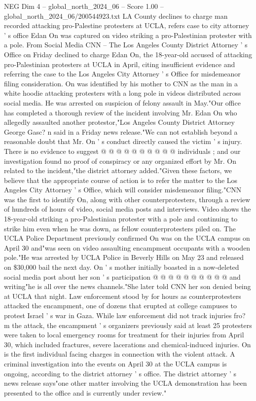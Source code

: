 \begin{textsample}{NEG Dim 4 – global\_north\_2024\_06 – Score 1.00 – global\_north\_2024\_06/200544923.txt}  \label{ex:f4_neg_323}
LA County declines to charge man recorded attacking pro-Palestine protesters at UCLA, refers case to city attorney ' s office Edan On was captured on video striking a pro-Palestinian protester with a pole.
From Social Media CNN -- The Los Angeles County District Attorney ' s Office on Friday declined to charge Edan On, the 18-year-old accused of attacking pro-Palestinian protesters at UCLA in April, citing insufficient evidence and referring the case to the Los Angeles City Attorney ' s Office for misdemeanor filing consideration.
On was identified by his mother to CNN as the man in a white hoodie attacking protesters with a long pole in videos distributed across social media.
He was arrested on suspicion of felony assault in May."Our office has completed a thorough review of the incident involving Mr.
Edan On who allegedly assaulted another protestor,"Los Angeles County District Attorney George Gasc? n said in a Friday news release."We can not establish beyond a reasonable doubt that Mr.
On ' s conduct directly caused the victim ' s injury.
There is no evidence to suggest @ @ @ @ @ @ @ @ @ @ individuals ; and our investigation found no proof of conspiracy or any organized effort by Mr.
On related to the incident,"the district attorney added."Given these factors, we believe that the appropriate course of action is to refer the matter to the Los Angeles City Attorney ' s Office, which will consider misdemeanor filing."CNN was the first to identify On, along with other counterprotesters, through a review of hundreds of hours of video, social media posts and interviews.
Video shows the 18-year-old striking a pro-Palestinian protester with a pole and continuing to strike him even when he was down, as fellow counterprotesters piled on.
The UCLA Police Department previously confirmed On was on the UCLA campus on April 30 and"was seen on video assaulting encampment occupants with a wooden pole."He was arrested by UCLA Police in Beverly Hills on May 23 and released on \$30,000 bail the next day.
On ' s mother initially boasted in a now-deleted social media post about her son ' s participation @ @ @ @ @ @ @ @ @ @ and writing"he is all over the news channels."She later told CNN her son denied being at UCLA that night.
Law enforcement stood by for hours as counterprotesters attacked the encampment, one of dozens that erupted at college campuses to protest Israel ' s war in Gaza.
While law enforcement did not track injuries fro? m the attack, the encampment ' s organizers previously said at least 25 protesters were taken to local emergency rooms for treatment for their injuries from April 30, which included fractures, severe lacerations and chemical-induced injuries.
On is the first individual facing charges in connection with the violent attack.
A criminal investigation into the events on April 30 at the UCLA campus is ongoing, according to the district attorney ' s office.
The district attorney ' s news release says"one other matter involving the UCLA demonstration has been presented to the office and is currently under review."

\end{textsample}
